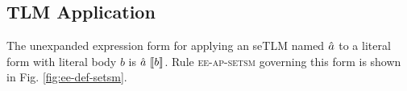 \documentclass[acmsmall,review,anonymous]{acmart}\settopmatter{printfolios=true,printccs=false,printacmref=false}
\begin{document}
\subsection{TLM Application}\label{sec:U-uetsm-application}\label{sec:s-TLM-ap}
The unexpanded expression form for applying an seTLM named $\hat{a}$ to a literal form with literal body $b$ is $\hat{a}~\llbracket b\rrbracket$. 
Rule \textsc{ee-ap-setsm} governing this form is shown in Fig. \ref{fig:ee-def-setsm}. 

\end{document}
